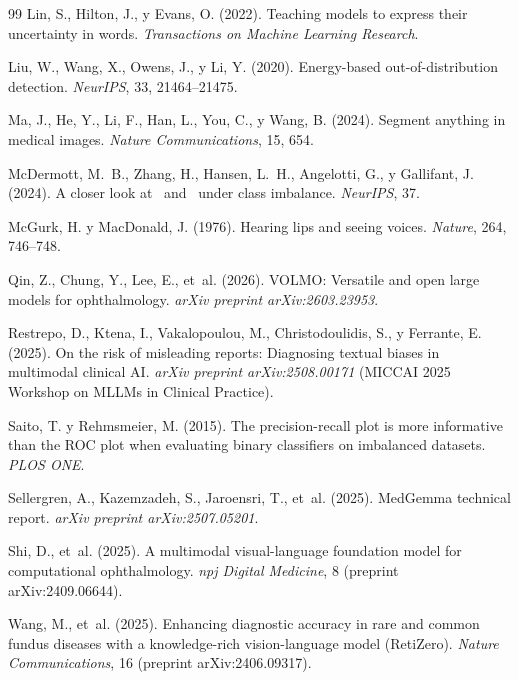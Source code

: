 \documentclass[12pt,a4paper]{article}
\newcommand{\AUROC}{\mathrm{AUROC}}
\newcommand{\AUPRC}{\mathrm{AUPRC}}
\begin{document}
\begin{thebibliography}{99}
Lin, S., Hilton, J., y Evans, O. (2022).
Teaching models to express their uncertainty in words.
\emph{Transactions on Machine Learning Research}.

Liu, W., Wang, X., Owens, J., y Li, Y. (2020).
Energy-based out-of-distribution detection.
\emph{NeurIPS}, 33, 21464--21475.

Ma, J., He, Y., Li, F., Han, L., You, C., y Wang, B. (2024).
Segment anything in medical images.
\emph{Nature Communications}, 15, 654.

McDermott, M.~B., Zhang, H., Hansen, L.~H., Angelotti, G., y Gallifant, J. (2024).
A closer look at \AUROC\ and \AUPRC\ under class imbalance.
\emph{NeurIPS}, 37.

McGurk, H. y MacDonald, J. (1976).
Hearing lips and seeing voices.
\emph{Nature}, 264, 746--748.

Qin, Z., Chung, Y., Lee, E., et~al. (2026).
VOLMO: Versatile and open large models for ophthalmology.
\emph{arXiv preprint arXiv:2603.23953}.

Restrepo, D., Ktena, I., Vakalopoulou, M., Christodoulidis, S., y Ferrante, E. (2025).
On the risk of misleading reports: Diagnosing textual biases in multimodal clinical AI.
\emph{arXiv preprint arXiv:2508.00171} (MICCAI 2025 Workshop on MLLMs in Clinical Practice).

Saito, T. y Rehmsmeier, M. (2015).
The precision-recall plot is more informative than the ROC plot when evaluating binary classifiers on imbalanced datasets.
\emph{PLOS ONE}.

Sellergren, A., Kazemzadeh, S., Jaroensri, T., et~al. (2025).
MedGemma technical report.
\emph{arXiv preprint arXiv:2507.05201}.

Shi, D., et~al. (2025).
A multimodal visual-language foundation model for computational ophthalmology.
\emph{npj Digital Medicine}, 8 (preprint arXiv:2409.06644).

Wang, M., et~al. (2025).
Enhancing diagnostic accuracy in rare and common fundus diseases with a knowledge-rich vision-language model (RetiZero).
\emph{Nature Communications}, 16 (preprint arXiv:2406.09317).


\end{thebibliography}
\end{document}
